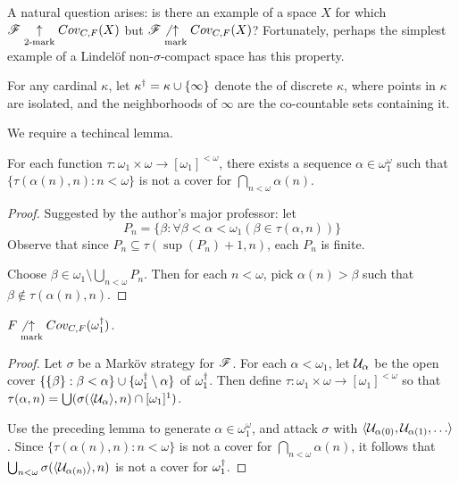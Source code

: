 A natural question arises: is there an example of a space $X$ for which
$\mathscr{F}\underset{2\text{-mark}}{\uparrow}Cov_{C,F}(X)$ but $\mathscr{F}\not\underset{\text{mark}}{\uparrow}Cov_{C,F}(X)$? Fortunately,
perhaps the simplest example of a Lindel\"of non-$\sigma$-compact
space has this property.

\begin{defn}
  For any cardinal $\kappa$, let $\kappa^\dagger=\kappa\cup\{\infty\}$ denote
  the  of discrete $\kappa$, where points in
  $\kappa$ are isolated, and the neighborhoods of $\infty$ are the co-countable
  sets containing it.
\end{defn}

We require a techincal lemma.

\begin{lem}
  For each function
  $\tau:\omega_1\times\omega \rightarrow [\omega_1]^{<\omega}$,
  there exists a sequence $\alpha\in\omega_1^\omega$
  such that $\{\tau(\alpha(n),n): n<\omega\}$ is not a cover for
  $\bigcap_{n<\omega}\alpha(n)$.
\end{lem}

\begin{proof}
  Suggested by the author's major professor: let
    \[
      P_n =
      \{
        \beta : \forall \beta <\alpha < \omega_1 ( \beta \in \tau(\alpha, n))
      \}
    \]
  Observe that since
  $P_n \subseteq \tau(\sup(P_n)+1, n)$, each $P_n$ is finite.

  Choose $\beta \in\omega_1\setminus \bigcup_{n<\omega} P_n$. Then for each
  $n<\omega$, pick $\alpha(n)>\beta$ such that
  $\beta \not\in \tau(\alpha(n),n)$.
\end{proof}

\begin{thm}
  $F\not\underset{\text{mark}}{\uparrow}Cov_{C,F}(\omega_1^\dagger)$.
\end{thm}

\begin{proof}
  Let $\sigma$ be a Mark\"ov strategy for $\mathscr{F}$. For each $\alpha<\omega_1$,
  let $\mathcal{U}_\alpha$ be the open cover
  $\{\{\beta\}:\beta<\alpha\}\cup\{\omega_1^\dagger\setminus\alpha\}$ of
  $\omega_1^\dagger$. Then define
  $\tau:\omega_1\times\omega \rightarrow [\omega_1]^{<\omega}$ so that
  $\tau(\alpha,n)=\bigcup(\sigma(\langle\mathcal{U}_\alpha\rangle,n)\cap[\omega_1]^1)$.

  Use the preceding lemma to generate $\alpha\in\omega_1^\omega$, and attack
  $\sigma$ with $\<\mc U_{\alpha(0)}, \mc U_{\alpha(1)},\dots\>$.
  Since $\{\tau(\alpha(n),n): n<\omega\}$ is not a cover for
  $\bigcap_{n<\omega}\alpha(n)$, it follows that
  $\bigcup_{n<\omega}\sigma(\langle\mathcal{U}_{\alpha(n)}\rangle,n)$ is not a cover for
  $\omega_1^\dagger$.
\end{proof}

